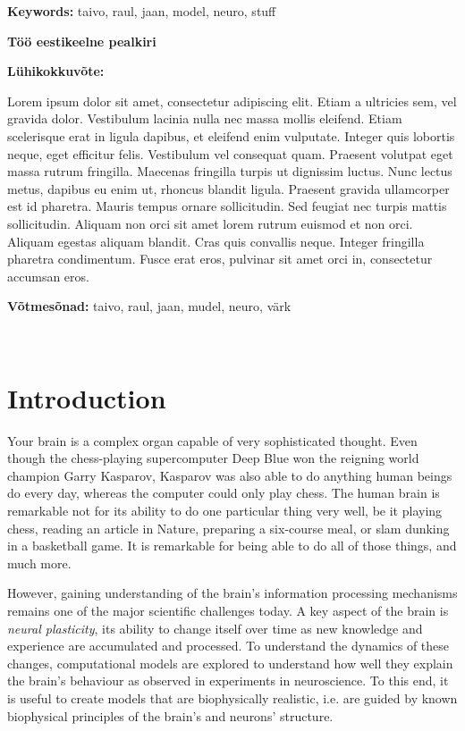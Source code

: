 \documentclass[a4paper,12pt]{report}
\theoremstyle{definition}
\begin{document}
\textbf{Keywords:} taivo, raul, jaan, model, neuro, stuff

\vspace{1.5cm}



{\textbf
{\Large Töö eestikeelne pealkiri}}

\textbf{Lühikokkuvõte:}

Lorem ipsum dolor sit amet, consectetur adipiscing elit. Etiam a ultricies sem, vel gravida dolor. Vestibulum lacinia nulla nec massa mollis eleifend. Etiam scelerisque erat in ligula dapibus, et eleifend enim vulputate. Integer quis lobortis neque, eget efficitur felis. Vestibulum vel consequat quam. Praesent volutpat eget massa rutrum fringilla. Maecenas fringilla turpis ut dignissim luctus. Nunc lectus metus, dapibus eu enim ut, rhoncus blandit ligula. Praesent gravida ullamcorper est id pharetra. Mauris tempus ornare sollicitudin. Sed feugiat nec turpis mattis sollicitudin. Aliquam non orci sit amet lorem rutrum euismod et non orci. Aliquam egestas aliquam blandit. Cras quis convallis neque. Integer fringilla pharetra condimentum. Fusce erat eros, pulvinar sit amet orci in, consectetur accumsan eros.

\textbf{Võtmesõnad:} taivo, raul, jaan, mudel, neuro, värk


\
\thispagestyle{empty}
\pagebreak

\tableofcontents
\newpage



\chapter*{Introduction}

Your brain is a complex organ capable of very sophisticated thought. Even though the chess-playing supercomputer Deep Blue won the reigning world champion Garry Kasparov, Kasparov was also able to do anything human beings do every day, whereas the computer could only play chess. The human brain is remarkable not for its ability to do one particular thing very well, be it playing chess, reading an article in Nature, preparing a six-course meal, or slam dunking in a basketball game. It is remarkable for being able to do all of those things, and much more.

However, gaining understanding of the brain's information processing mechanisms remains one of the major scientific challenges today. A key aspect of the brain is \emph{neural plasticity}, its ability to change itself over time as new knowledge and experience are accumulated and processed. To understand the dynamics of these changes, computational models are explored to understand how well they explain the brain's behaviour as observed in experiments in neuroscience. To this end, it is useful to create models that are biophysically realistic, i.e. are guided by known biophysical principles of the brain's and neurons' structure.
\end{document}
